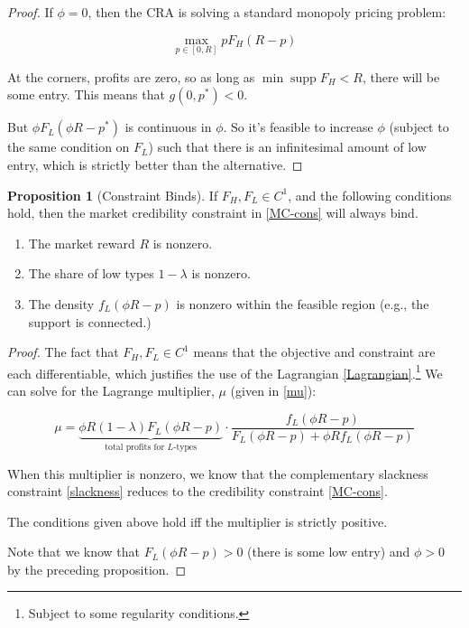 \documentclass{article}
\theoremstyle{definition}
\newtheorem{proposition}{Proposition}
\DeclareMathOperator\supp{supp}
\begin{document}
\begin{proof}
    If $\phi = 0$, then the CRA is solving a standard monopoly pricing problem: 

    \[ \max\limits_{p \in [0, R]} p F_H(R - p) \]

    At the corners, profits are zero, so as long as $\min \supp F_H < R$, there will be some entry. This means that $g(0, p^*) < 0$.

    But $\phi F_L(\phi R - p^*)$ is continuous in $\phi$. So it's feasible to increase $\phi$ (subject to the same condition on $F_L$) such that there is an infinitesimal amount of low entry, which is strictly better than the alternative. 
\end{proof}

\newpage

\begin{proposition}[Constraint Binds] If $F_H, F_L \in C^1$, and the following conditions hold, then the market credibility constraint in \eqref{MC-cons} will always bind.

\begin{enumerate}
    \item The market reward $R$ is nonzero.
    \item The share of low types $1 - \lambda$ is nonzero.
    \item The density $f_L(\phi R - p)$ is nonzero within the feasible region (e.g., the support is connected.)
\end{enumerate}

\end{proposition} 

\begin{proof}
    The fact that $F_H, F_L \in C^1$ means that the objective and constraint are each differentiable, which justifies the use of the Lagrangian \eqref{Lagrangian}.\footnote{Subject to some regularity conditions.} We can solve for the Lagrange multiplier, $\mu$ (given in \eqref{mu}):

    \[     \mu = \underbrace{\phi R(1 - \lambda)F_L(\phi R - p)}_{\text{total profits for $L$-types}} \cdot \frac{f_L(\phi R - p)}{F_L(\phi R - p) + \phi R f_L (\phi R - p)} \]
    
    When this multiplier is nonzero, we know that the complementary slackness constraint \eqref{slackness} reduces to the credibility constraint \eqref{MC-cons}.

    The conditions given above hold iff the multiplier is strictly positive.

    Note that we know that $F_L(\phi R - p) > 0$ (there is some low entry) and $\phi > 0$ by the preceding proposition.
\end{proof}
\end{document}
